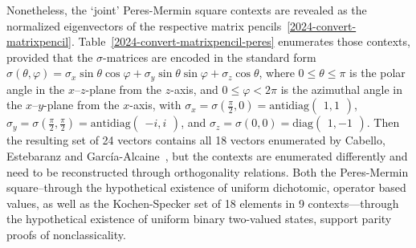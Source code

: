\documentclass[
  twocolumn,
 showpacs,
 showkeys,
 preprintnumbers,
 amsmath,amssymb,
 aps,
 prl,
  longbibliography,
 floatfix,
 ]{revtex4-2}
\begin{document}
Nonetheless, the `joint' Peres-Mermin square contexts are revealed as the normalized eigenvectors of the respective matrix pencils~\eqref{2024-convert-matrixpencil}.
Table~\ref{2024-convert-matrixpencil-peres} enumerates those contexts,
provided that the $\sigma$-matrices are encoded in the standard form
$
\sigma ( \theta ,\varphi ) = \sigma_x \sin\theta \cos\varphi  + \sigma_y \sin\theta \sin\varphi  + \sigma_z \cos\theta
$,
where $0 \le \theta \le \pi$ is the polar angle in the $x$--$z$-plane
from the $z$-axis,
and $0 \le \varphi < 2 \pi$ is the azimuthal angle in the $x$--$y$-plane
from the $x$-axis,
with
$
\sigma_x =  {\sigma} \left(\frac{\pi}{2},0\right)= \mathrm{antidiag}\begin{pmatrix} 1 , 1  \end{pmatrix}
$,
$
\sigma_y =  {\sigma} \left(\frac{\pi}{2},\frac{\pi}{2}\right)= \mathrm{antidiag}\begin{pmatrix} -i ,   i  \end{pmatrix}
$,
and
$
\sigma_z =  {\sigma} \left(0,0\right)= \mathrm{diag} \begin{pmatrix} 1 ,  -1   \end{pmatrix}
$.
Then the resulting set of 24 vectors contains all 18 vectors enumerated by Cabello, Estebaranz and Garc{\'{i}}a-Alcaine~\cite{cabello-96},
but the contexts are enumerated differently and need to be reconstructed through orthogonality relations.
Both the Peres-Mermin square--through the hypothetical existence of  uniform dichotomic, operator based values,
as well as the Kochen-Specker set of 18 elements in 9 contexts---through the hypothetical existence of  uniform binary two-valued states,
support parity proofs of nonclassicality.
\end{document}
